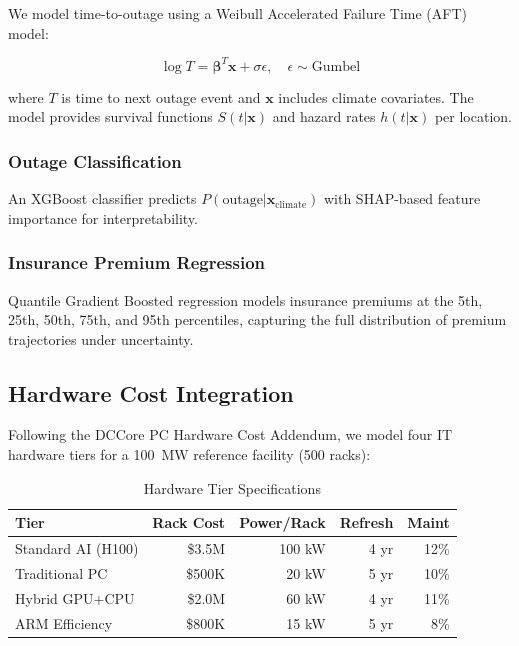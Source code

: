 \documentclass[12pt,a4paper]{article}
\begin{document}
We model time-to-outage using a Weibull Accelerated Failure Time (AFT) model:

\begin{equation}
\log T = \boldsymbol{\beta}^T \mathbf{x} + \sigma \epsilon, \quad \epsilon \sim \text{Gumbel}
\end{equation}

where $T$ is time to next outage event and $\mathbf{x}$ includes climate covariates. The model provides survival functions $S(t|\mathbf{x})$ and hazard rates $h(t|\mathbf{x})$ per location.

\subsubsection{Outage Classification}

An XGBoost classifier predicts $P(\text{outage} | \mathbf{x}_{\text{climate}})$ with SHAP-based feature importance for interpretability.

\subsubsection{Insurance Premium Regression}

Quantile Gradient Boosted regression models insurance premiums at the 5th, 25th, 50th, 75th, and 95th percentiles, capturing the full distribution of premium trajectories under uncertainty.

\subsection{Hardware Cost Integration}

Following the DCCore PC Hardware Cost Addendum, we model four IT hardware tiers for a 100~MW reference facility (500 racks):

\begin{table}[H]
\centering
\caption{Hardware Tier Specifications}
\small
\begin{tabular}{lrrrr}
\toprule
\textbf{Tier} & \textbf{Rack Cost} & \textbf{Power/Rack} & \textbf{Refresh} & \textbf{Maint} \\
\midrule
Standard AI (H100)  & \$3.5M & 100 kW & 4 yr & 12\% \\
Traditional PC      & \$500K & 20 kW  & 5 yr & 10\% \\
Hybrid GPU+CPU      & \$2.0M & 60 kW  & 4 yr & 11\% \\
ARM Efficiency      & \$800K & 15 kW  & 5 yr & 8\%  \\
\bottomrule
\end{tabular}
\end{table}
\end{document}
